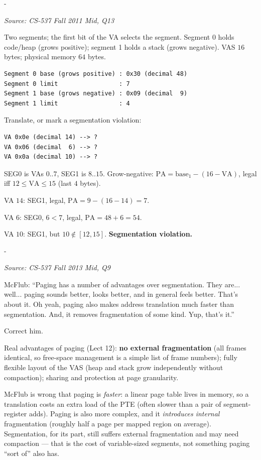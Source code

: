 \documentclass[11pt,a4paper]{article}
\makeatletter
\newcommand{\keepspace}[1]{\par\penalty-100\begingroup
  \setlength{\dimen@}{#1}\dimen@ii\pagegoal\advance\dimen@ii-\pagetotal
  \ifdim\dimen@>\dimen@ii\ifdim\dimen@ii>\z@\vfil\fi\break\fi\endgroup}
\newcounter{qn}[section]
\newenvironment{Qn}[4]{%
  \refstepcounter{qn}\keepspace{7\baselineskip}%
  \begin{tcolorbox}[qboxstyle, title={Q\thesection.\theqn\ \ [#1 \textbar\ #2]\ \ #4}]%
  {\footnotesize\color{g3}\textit{Source: #3}}\par\smallskip%
}{%
  \end{tcolorbox}%
}
\newenvironment{Sol}{%
  \begin{tcolorbox}[sboxstyle, title={Solution}]%
}{%
  \end{tcolorbox}\vspace{0.35em}%
}
\makeatother
\begin{document}
\begin{Qn}{Medium-Hard}{Lect 10}{CS-537 Fall 2011 Mid, Q13}{Translate three VAs in a 16-byte two-segment space}
Two segments; the first bit of the VA selects the segment. Segment 0
holds code/heap (grows positive); segment 1 holds a stack (grows
negative). VAS $16$ bytes; physical memory $64$ bytes.

\begin{lstlisting}[numbers=none]
Segment 0 base (grows positive) : 0x30 (decimal 48)
Segment 0 limit                 : 7
Segment 1 base (grows negative) : 0x09 (decimal  9)
Segment 1 limit                 : 4
\end{lstlisting}

Translate, or mark a segmentation violation:
\begin{lstlisting}[numbers=none]
VA 0x0e (decimal 14) --> ?
VA 0x06 (decimal  6) --> ?
VA 0x0a (decimal 10) --> ?
\end{lstlisting}
\end{Qn}
\begin{Sol}
SEG0 is VAs $0..7$, SEG1 is $8..15$.
Grow-negative:
$\mathrm{PA}=\mathrm{base}_1-(16-\mathrm{VA})$, legal iff
$12\le\mathrm{VA}\le 15$ (last $4$ bytes).

VA $14$: SEG1, legal, $\mathrm{PA}=9-(16-14)=7$.

VA $6$: SEG0, $6<7$, legal, $\mathrm{PA}=48+6=54$.

VA $10$: SEG1, but $10\notin[12,15]$. \textbf{Segmentation
violation.}
\end{Sol}

\begin{Qn}{Medium}{Lect 10}{CS-537 Fall 2013 Mid, Q9}{McFlub's advantages of paging over segmentation}
McFlub: ``Paging has a number of advantages over segmentation. They
are... well... paging sounds better, looks better, and in general
feels better. That's about it. Oh yeah, paging also makes address
translation much faster than segmentation. And, it removes
fragmentation of some kind. Yup, that's it.''

Correct him.
\end{Qn}
\begin{Sol}
Real advantages of paging (Lect 12): \textbf{no external
fragmentation} (all frames identical, so free-space management is a
simple list of frame numbers); fully flexible layout of the VAS (heap
and stack grow independently without compaction); sharing and
protection at page granularity.

McFlub is wrong that paging is \emph{faster}: a linear page table
lives in memory, so a translation costs an extra load of the PTE
(often slower than a pair of segment-register adds). Paging is also
more complex, and it \emph{introduces internal} fragmentation
(roughly half a page per mapped region on average). Segmentation, for
its part, still suffers external fragmentation and may need
compaction --- that is the cost of variable-sized segments, not
something paging ``sort of'' also has.
\end{Sol}
\end{document}
